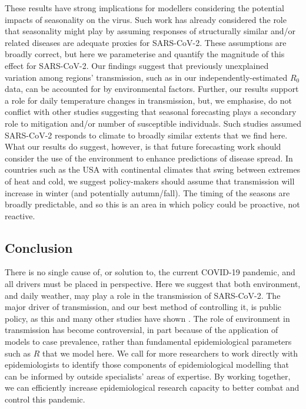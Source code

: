 \documentclass[12pt,english,a4paper]{article}
\newcommand{\virus}{SARS-CoV-2\xspace}
\newcommand{\disease}{COVID-19\xspace}
\newcommand{\RO}{$R_0$\xspace}
\begin{document}
These results have strong implications for modellers considering the potential impacts of seasonality on the virus. Such work has already considered the role that seasonality might play by assuming responses of structurally similar and/or related diseases are adequate proxies for \virus \cite{Baker2020}. These assumptions are broadly correct, but here we parameterise and quantify the magnitude of this effect for \virus. Our findings suggest that previously unexplained variation among regions' transmission, such as in our independently-estimated \RO data, can be accounted for by environmental factors.
Further, our results support a role for daily temperature changes in transmission, but, we emphasise, do not conflict with other studies suggesting that seasonal forecasting plays a secondary role to mitigation and/or number of susceptible individuals. Such studies \cite{Baker2020} assumed \virus responds to climate to broadly similar extents that we find here.
What our results do suggest, however, is that future forecasting work should consider the use of the environment to enhance predictions of disease spread. In countries such as the USA with continental climates that swing between extremes of heat and cold, we suggest policy-makers should assume that transmission will increase in winter (and potentially autumn/fall). The timing of the seasons are broadly predictable, and so this is an area in which policy could be proactive, not reactive.


\subsection*{Conclusion} 
There is no single cause of, or solution to, the current \disease pandemic, and all drivers must be placed in perspective. Here we suggest that both environment, and daily weather, may play a role in the transmission of \virus. The major driver of transmission, and our best method of controlling it, is public policy, as this and many other studies have shown \citep{Jarvis2020, Lau2020}. 
The role of environment in transmission has become controversial, in part because of the application of models to case prevalence, rather than fundamental epidemiological parameters such as $R$
that we model here. We call for more researchers to work directly with epidemiologists 
to identify those components of epidemiological modelling that can be informed by outside specialists' areas of expertise. By working together, we can efficiently increase epidemiological research capacity to better combat and control this pandemic.
\end{document}
